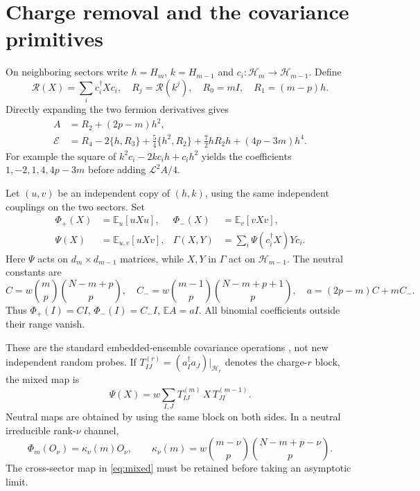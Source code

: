 \documentclass[11pt,a4paper]{article}
\newcommand{\EE}{\mathbb E}
\newcommand{\rr}{\mathcal R}
\newcommand{\core}{\mathcal E}
\begin{document}
\newpage
\section{Charge removal and the covariance primitives}
On neighboring sectors write $h=H_m$, $k=H_{m-1}$ and
$c_i:\mathcal H_m\to\mathcal H_{m-1}$. Define
\begin{equation}
 \rr(X)=\sum_i c_i^\dagger Xc_i,\quad R_j=\rr(k^j),\quad
 R_0=mI,\quad R_1=(m-p)h.
\end{equation}
Directly expanding the two fermion derivatives gives
\begin{align}
 A&=R_2+(2p-m)h^2,\\
 \core&=R_4-2\{h,R_3\}+\tfrac54\{h^2,R_2\}
                  +\tfrac72 hR_2h+(4p-3m)h^4. \label{eq:raw}
\end{align}
For example the square of
$k^2c_i-2kc_ih+c_ih^2$ yields the coefficients
$1,-2,1,4,4p-3m$ before adding $\mathcal L^2A/4$.

Let $(u,v)$ be an independent copy of $(h,k)$, using the same
independent couplings on the two sectors. Set
\begin{align}
 \Phi_+(X)&=\EE_u[uXu],&\Phi_-(X)&=\EE_v[vXv],\\
 \Psi(X)&=\EE_{u,v}[uXv],&
 \Gamma(X,Y)&=\sum_i\Psi(c_i^\dagger X)Yc_i. \label{eq:maps}
\end{align}
Here $\Psi$ acts on $d_m\times d_{m-1}$ matrices, while $X,Y$
in $\Gamma$ act on $\mathcal H_{m-1}$. The neutral constants are
\begin{equation}
 C=w\binom mp\binom{N-m+p}p,\quad
 C_-=w\binom{m-1}p\binom{N-m+p+1}p,\quad
 a=(2p-m)C+mC_-.
\end{equation}
Thus $\Phi_+(I)=CI$, $\Phi_-(I)=C_-I$, $\EE A=aI$.
All binomial coefficients outside their range vanish.

These are the standard embedded-ensemble covariance operations
\cite{Kota,TT}, not new independent random probes. If
$T^{(r)}_{IJ}=(a_I^\dagger a_J)|_{\mathcal H_r}$
denotes the charge-$r$ block, the mixed map is
\begin{equation}
 \Psi(X)=w\sum_{I,J} T^{(m)}_{IJ}\,X\,T^{(m-1)}_{JI}.
 \label{eq:mixed}
\end{equation}
Neutral maps are obtained by using the same block on both sides.
In a neutral irreducible rank-$\nu$ channel,
\begin{equation}
 \Phi_m(O_\nu)=\kappa_\nu(m)O_\nu,\qquad
 \kappa_\nu(m)=w\binom{m-\nu}p\binom{N-m+p-\nu}p.
\end{equation}
The cross-sector map in \eqref{eq:mixed} must be retained before
taking an asymptotic limit.
\end{document}
